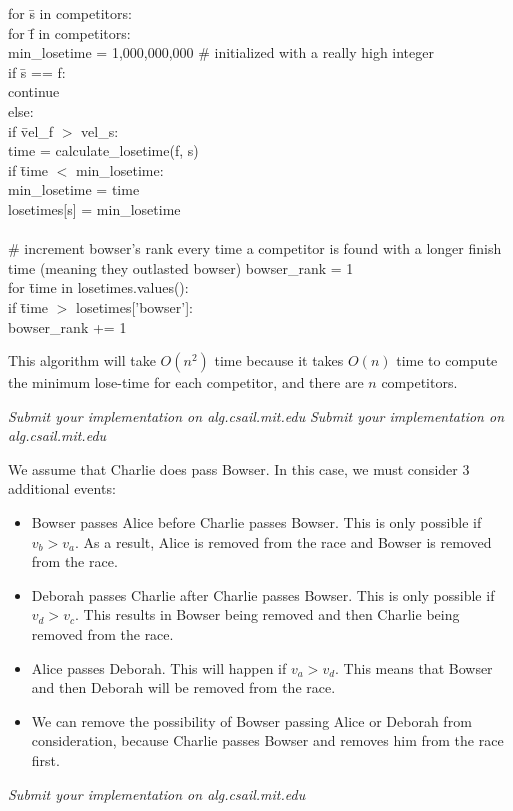 \documentclass[12pt,twoside]{article}
\begin{document}
\begin{problems}
\begin{problemparts}
\begin{tabbing}
for \= s in competitors: \\
	\> for \= f in competitors: \\
		\>\> min\_losetime = 1,000,000,000  \# initialized with a really high integer \\
		\>\> if \= s == f:\\
			\>\>\> continue\\
		\>\>else:\\
			\>\>\>if \=vel\_f $>$ vel\_s:\\
				\>\>\>\>time = calculate\_losetime(f, s)\\
				\>\>\>\>if \= time $<$ min\_losetime:\\
					\>\>\>\>\>min\_losetime = time\\
	\>losetimes[s] = min\_losetime\\
	\\
	\# increment bowser's rank every time a competitor is found with a longer finish time (meaning they outlasted bowser)
	bowser\_rank = 1\\
	for \=time in losetimes.values():\\
		\>if \=time $>$ losetimes['bowser']:\\
			\>\>bowser\_rank += 1\\
\end{tabbing}
\smallskip
This algorithm will take $O(n^2)$ time because it takes $O(n)$ time to compute the minimum lose-time for each competitor, and there are $n$ competitors. 


\problempart \emph{Submit your implementation on alg.csail.mit.edu}
\problempart \emph{Submit your implementation on alg.csail.mit.edu}


\problempart We assume that Charlie does pass Bowser. In this case, we must consider 3 additional events:
\begin{itemize}
\item Bowser passes Alice before Charlie passes Bowser. This is only possible if $v_b > v_a$. As a result, Alice is removed from the race and Bowser is removed from the race.
\item Deborah passes Charlie after Charlie passes Bowser. This is only possible if $v_d > v_c$. This results in Bowser being removed and then Charlie being removed from the race.
\item Alice passes Deborah. This will happen if $v_a > v_d$. This means that Bowser and then Deborah will be removed from the race.
\item We can remove the possibility of Bowser passing Alice or Deborah from consideration, because Charlie passes Bowser and removes him from the race first.

\end{itemize}



\problempart \emph{Submit your implementation on alg.csail.mit.edu}
\end{problemparts}

\end{problems}
\end{document}
